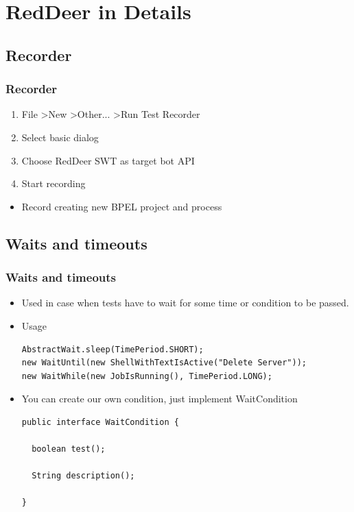 \documentclass{beamer}
\begin{document}
\section{RedDeer in Details}

\subsection{Recorder}
\begin{frame}[fragile]
\frametitle{Recorder}
\begin{enumerate}
\item File \textgreater New \textgreater Other... \textgreater Run Test Recorder
\item Select basic dialog
\item Choose RedDeer SWT as target bot API
\item Start recording
\end{enumerate}
\begin{itemize}
\item Record creating new BPEL project and process
\end{itemize}

\end{frame}

\subsection{Waits and timeouts}
\begin{frame}[fragile]
\frametitle{Waits and timeouts}
\begin{itemize}
\item Used in case when tests have to wait for some time or condition to be passed.
\item Usage
\begin{lstlisting}
AbstractWait.sleep(TimePeriod.SHORT);
new WaitUntil(new ShellWithTextIsActive("Delete Server"));
new WaitWhile(new JobIsRunning(), TimePeriod.LONG);
\end{lstlisting}
\item You can create our own condition, just implement WaitCondition
\begin{lstlisting}
public interface WaitCondition {

  boolean test();

  String description();

}
\end{lstlisting}
\end{itemize}
\end{frame}
\end{document}
